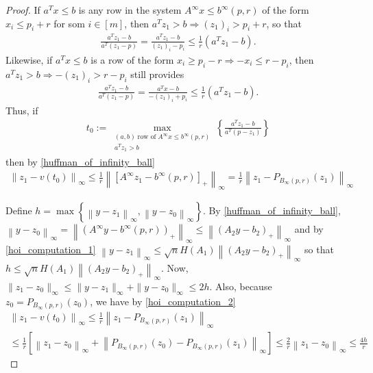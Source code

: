 \documentclass{article}
\theoremstyle{case}
\numberwithin{theorem}{subsection}
\newcommand{\atr}{A^{\infty}}
\newcommand{\btr}{b^{\infty}}
\begin{document}
\begin{proof}
If $a^Tx \le b$ is any row in the system $\atr x \le \btr(p, r)$ 
of the form $x_i \le p_i + r$ for som $i \in [m]$, 
then $a^Tz_1 > b \Longrightarrow \left(z_1 \right)_i > p_i + r$, so that
\begin{align*}
\frac {a^Tz_1 - b} {a^T\left(z_1 - p\right)}
= \frac {a^Tz_1 - b} {\left(z_1 \right)_i - p_i} \le \frac 1 r \left(a^Tz_1 - b\right).
\end{align*}
Likewise, if $a^Tx \le b$ is a row of the form $x_i \ge p_i - r \Longrightarrow -x_i \le r - p_i$, 
then $a^Tz_1 > b \Longrightarrow -\left(z_1 \right)_i > r - p_i$ still provides
\begin{align*}
\frac {a^Tz_1 - b} {a^T\left(z_1 - p\right)}
= \frac {a^Tx - b} {-\left(z_1 \right)_i + p_i} \le \frac 1 r \left(a^Tz_1 - b\right).
\end{align*}
Thus, if
\begin{align*}
t_0 := \max_{\substack{
(a, b) \; \textrm{row of} \; \atr x \le\btr(p, r) \\
a^T z_1 > b
}}\left\{\frac {a^Tz_1 - b} {a^T\left(p - z_1\right)} \right\}
\end{align*}
then by \cref{huffman_of_infinity_ball}
\begin{align}
\left\|z_1 - v\left(t_0\right) \right\|_{\infty}
\le \frac 1 r \left\|\left[\atr z_1 - \btr(p, r)\right]_+\right\|_{\infty}
= \frac 1 r \left\|z_1 - P_{B_{\infty}(p, r)}(z_1)\right\|_{\infty}
\label{hoi_computation_2}
\end{align}

Define $h = \max\left\{\left\|y - z_1\right\|_{\infty}, \left\|y - z_0\right\|_{\infty}\right\}$.
By \cref{huffman_of_infinity_ball}, 
$
\left\|y - z_0\right\|_{\infty} 
= \left\|\left(\atr y - \btr(p, r)\right)_+\right\|_{\infty}
\le \left\|\left(A_2 y - b_2\right)_+\right\|_{\infty}
$
and by \cref{hoi_computation_1}
$
\left\|y - z_1\right\|_{\infty}
\le \sqrt{n} H\left(A_1\right) \left\|\left(A_2y - b_2\right)_+\right\|_{\infty}
$
so that
$
h \le \sqrt{n} H\left(A_1\right) \left\|\left(A_2y - b_2\right)_+\right\|_{\infty}.
$
Now, $\|z_1 - z_0\|_{\infty} \le \|y - z_1\|_{\infty} + \|y - z_0\|_{\infty} \le 2 h$.
Also, because $z_0 = P_{B_{\infty}\left(p, r\right)}\left(z_0\right)$, we have by \cref{hoi_computation_2}
\begin{align*}
\left\|z_1 - v(t_0)\right\|_{\infty}
\le \frac 1 r \left\|z_1 - P_{B_{\infty}\left(p, r\right)}\left(z_1\right)\right\|_{\infty} \\
\le \frac 1 r \left[
\left\|z_1 - z_0\right\|_{\infty}
+ \left\| P_{B_{\infty}\left(p, r\right)}\left(z_0\right) - P_{B_{\infty}\left(p, r\right)}\left(z_1\right)\right\|_{\infty}
\right]
\le \frac 2 r \left\|z_1 - z_0\right\|_{\infty}
\le \frac {4h} r
\end{align*}


\end{proof}
\end{document}
